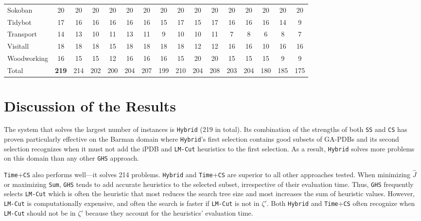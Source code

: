 \begin{table}[htb]
\begin{tabular}{lccccccccccccccc}
Sokoban&       20&     20&    20&   20&   20&   20&  20&   20&    20&  20&   20&   20&   20&    20&  20\\
Tidybot&       17&     16&    16&   16&   16&   16&  15&   17&    15&  17&   16&   16&   16&    14&   9\\
Transport&     14&     13&    10&   11&   13&   11&   9&   10&    10&  11&    7&    8&    6&     8&   7\\
Visitall&      18&     18&    18&   15&   18&   18&  18&   18&    12&  12&   16&   16&   10&    16&  16\\
Woodworking&   16&     15&    15&   12&   16&   16&  16&   15&    20&  20&   15&   15&   15&     9&   9\\ \hline
Total&        \textbf{219}&    214&   202&  200&  204&  207& 199&  210&   204& 208&  203&  204&  180&   185& 175\\ \hline
\end{tabular}
\label{tb_two}
\end{table}

\section{Discussion of the Results}
\noindent
The system that solves the largest number of instances is \texttt{Hybrid} (219 in total). Its combination of the strengths of both \texttt{SS} and \texttt{CS} has proven particularly effective on the Barman domain where \texttt{Hybrid}'s first selection contains good subsets of GA-PDBs and its second selection recognizes when it must not add the iPDB and \texttt{LM-Cut} heuristics to the first selection. As a result, \texttt{Hybrid} solves more problems on this domain than any other \texttt{GHS} approach. 

\texttt{Time}+\texttt{CS} also performs well---it solves 214 problems.  \texttt{Hybrid} and \texttt{Time}+\texttt{CS} are superior to all other approaches tested. %
When minimizing $\hat{J}$ or maximizing \texttt{Sum}, \texttt{GHS} tends to add accurate heuristics to the selected subset, irrespective of their evaluation time. Thus, \texttt{GHS} frequently selects \texttt{LM-Cut} which is often the heuristic that most reduces the search tree size and most increases the sum of heuristic values. However, \texttt{LM-Cut} is computationally expensive, and often  the search is faster if \texttt{LM-Cut} is not in $\zeta'$. Both \texttt{Hybrid} and \texttt{Time}+\texttt{CS} often recognize when \texttt{LM-Cut} should not be in $\zeta'$ because they account for the heuristics' evaluation time.

